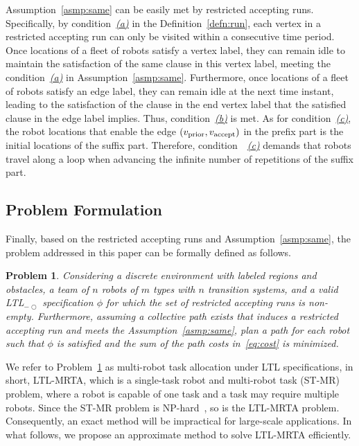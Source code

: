 \documentclass[Afour,sageh,times]{sagej}
\newtheorem{problem}{Problem}
\newcommand{\ltl}{ {\it LTL}$_{-\bigcirc}$ }
\newcommand{\vertex}[1]{v_{\textup{#1}}}
\begin{document}
Assumption~\ref{asmp:same} can be easily met by restricted accepting runs. Specifically, by condition~\hyperref[cond:a]{\it (a)} in the Definition~\ref{defn:run}, each vertex in a restricted accepting run can only be visited within a consecutive time period.  Once locations of a fleet of robots satisfy a  vertex label, they can remain idle to maintain the satisfaction of the same clause in this vertex label, meeting the condition~\hyperref[asmp:a]{\it (a)} in Assumption~\ref{asmp:same}. Furthermore, once locations of a fleet of  robots satisfy an edge label, they can remain idle at the next time instant, leading to the satisfaction of the clause in the end vertex label that the satisfied clause in the edge label implies. Thus, condition~\hyperref[asmp:b]{\it (b)} is  met. As for condition~\hyperref[asmp:c]{\it (c)}, the robot locations that enable the edge $(\vertex{prior}, \vertex{accept})$ in the prefix part is the initial locations of the suffix part. Therefore, condition~~\hyperref[asmp:c]{\it (c)} demands that robots travel along a loop when advancing the infinite number of repetitions of the suffix part.
\subsection{Problem Formulation}\label{sec:formulation}
Finally, based on the restricted accepting runs and Assumption~\ref{asmp:same}, the problem addressed in this paper can be formally defined as follows.

\begin{problem}\label{prob:1}
Considering  a discrete environment with labeled regions and obstacles, a team of $n$ robots of $m$ types with $n$ transition systems, and a valid \ltl specification $\phi$ for which the set of restricted accepting runs is non-empty. Furthermore, assuming a collective path  exists that induces a restricted  accepting run  and meets the Assumption~\ref{asmp:same}, plan a path for each robot such that $\phi$ is satisfied and the sum of the path costs in~\eqref{eq:cost} is minimized.
\end{problem}

We refer to Problem~\ref{prob:1} as multi-robot task allocation under LTL specifications, in short, LTL-MRTA, which is a single-task robot and multi-robot task (ST-MR) problem, where a robot is capable of one task and a task may require multiple robots. Since the ST-MR problem is NP-hard~\citep{korsah2013comprehensive,nunes2017taxonomy}, so is the LTL-MRTA problem. Consequently, an exact method will be impractical for large-scale applications. In what follows, we propose an approximate method to solve LTL-MRTA efficiently.
\end{document}
